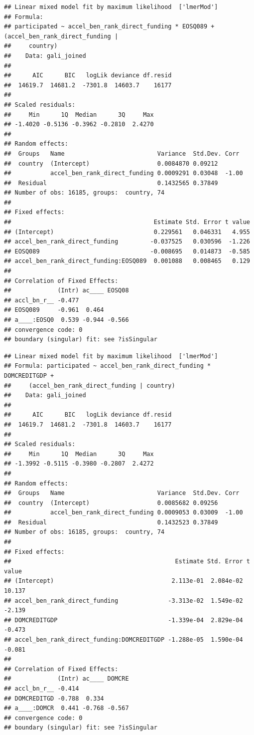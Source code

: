 \documentclass[
  english,
  man]{apa6}
\begin{document}
\begin{verbatim}
## Linear mixed model fit by maximum likelihood  ['lmerMod']
## Formula: 
## participated ~ accel_ben_rank_direct_funding * EOSQ089 + (accel_ben_rank_direct_funding |  
##     country)
##    Data: gali_joined
## 
##      AIC      BIC   logLik deviance df.resid 
##  14619.7  14681.2  -7301.8  14603.7    16177 
## 
## Scaled residuals: 
##     Min      1Q  Median      3Q     Max 
## -1.4020 -0.5136 -0.3962 -0.2810  2.4270 
## 
## Random effects:
##  Groups   Name                          Variance  Std.Dev. Corr 
##  country  (Intercept)                   0.0084870 0.09212       
##           accel_ben_rank_direct_funding 0.0009291 0.03048  -1.00
##  Residual                               0.1432565 0.37849       
## Number of obs: 16185, groups:  country, 74
## 
## Fixed effects:
##                                        Estimate Std. Error t value
## (Intercept)                            0.229561   0.046331   4.955
## accel_ben_rank_direct_funding         -0.037525   0.030596  -1.226
## EOSQ089                               -0.008695   0.014873  -0.585
## accel_ben_rank_direct_funding:EOSQ089  0.001088   0.008465   0.129
## 
## Correlation of Fixed Effects:
##             (Intr) ac____ EOSQ08
## accl_bn_r__ -0.477              
## EOSQ089     -0.961  0.464       
## a____:EOSQ0  0.539 -0.944 -0.566
## convergence code: 0
## boundary (singular) fit: see ?isSingular
\end{verbatim}

\begin{verbatim}
## Linear mixed model fit by maximum likelihood  ['lmerMod']
## Formula: participated ~ accel_ben_rank_direct_funding * DOMCREDITGDP +  
##     (accel_ben_rank_direct_funding | country)
##    Data: gali_joined
## 
##      AIC      BIC   logLik deviance df.resid 
##  14619.7  14681.2  -7301.8  14603.7    16177 
## 
## Scaled residuals: 
##     Min      1Q  Median      3Q     Max 
## -1.3992 -0.5115 -0.3980 -0.2807  2.4272 
## 
## Random effects:
##  Groups   Name                          Variance  Std.Dev. Corr 
##  country  (Intercept)                   0.0085682 0.09256       
##           accel_ben_rank_direct_funding 0.0009053 0.03009  -1.00
##  Residual                               0.1432523 0.37849       
## Number of obs: 16185, groups:  country, 74
## 
## Fixed effects:
##                                              Estimate Std. Error t value
## (Intercept)                                 2.113e-01  2.084e-02  10.137
## accel_ben_rank_direct_funding              -3.313e-02  1.549e-02  -2.139
## DOMCREDITGDP                               -1.339e-04  2.829e-04  -0.473
## accel_ben_rank_direct_funding:DOMCREDITGDP -1.288e-05  1.590e-04  -0.081
## 
## Correlation of Fixed Effects:
##             (Intr) ac____ DOMCRE
## accl_bn_r__ -0.414              
## DOMCREDITGD -0.788  0.334       
## a____:DOMCR  0.441 -0.768 -0.567
## convergence code: 0
## boundary (singular) fit: see ?isSingular
\end{verbatim}
\end{document}
